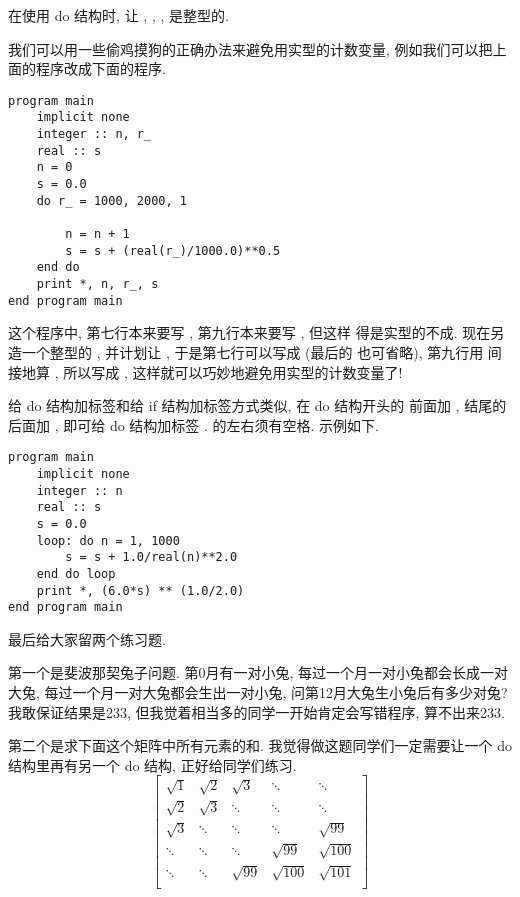 \begin{convention}
    在使用 do 结构时, 让 \ttt{\emph{[m]}}, \ttt{\emph{[m1]}}, \ttt{\emph{[m2]}}, \ttt{\emph{[m3]}} 是整型的.
\end{convention}

我们可以用一些偷鸡摸狗的正确办法来避免用实型的计数变量, 例如我们可以把上面的程序改成下面的程序.
\begin{lstlisting}
program main
    implicit none
    integer :: n, r_
    real :: s
    n = 0
    s = 0.0
    do r_ = 1000, 2000, 1

        n = n + 1
        s = s + (real(r_)/1000.0)**0.5
    end do
    print *, n, r_, s
end program main
\end{lstlisting}
这个程序中, 第七行本来要写 , 第九行本来要写 , 但这样  得是实型的不成. 现在另造一个整型的 , 并计划让 , 于是第七行可以写成  (最后的  也可省略), 第九行用  间接地算 , 所以写成 , 这样就可以巧妙地避免用实型的计数变量了!

给 do 结构加标签和给 if 结构加标签方式类似, 在 do 结构开头的  前面加 \ttt{[tag]:}, 结尾的  后面加 \ttt{[tag]}, 即可给 do 结构加标签 \ttt{[tag]}.  的左右须有空格. 示例如下.
\begin{lstlisting}
program main
    implicit none
    integer :: n
    real :: s
    s = 0.0
    loop: do n = 1, 1000
        s = s + 1.0/real(n)**2.0
    end do loop
    print *, (6.0*s) ** (1.0/2.0)
end program main
\end{lstlisting}

最后给大家留两个练习题.

第一个是斐波那契兔子问题. 第0月有一对小兔, 每过一个月一对小兔都会长成一对大兔, 每过一个月一对大兔都会生出一对小兔, 问第12月大兔生小兔后有多少对兔? 我敢保证结果是233, 但我觉着相当多的同学一开始肯定会写错程序, 算不出来233.

第二个是求下面这个矩阵中所有元素的和. 我觉得做这题同学们一定需要让一个 do 结构里再有另一个 do 结构, 正好给同学们练习.\label{hw_2}\pagebreak
\begin{equation*}
    \begin{bmatrix}
        \sqrt{1}     &\sqrt{2}     &\sqrt{3}     &\ddots&\ddots\\
        \sqrt{2}     &\sqrt{3}     &\ddots&\ddots&\ddots\\
        \sqrt{3}     &\ddots&\ddots&\ddots&\sqrt{99}    \\
        \ddots&\ddots&\ddots&\sqrt{99}    &\sqrt{100}    \\
        \ddots&\ddots&\sqrt{99}    &\sqrt{100}   &\sqrt{101}   \\
    \end{bmatrix}
\end{equation*}

